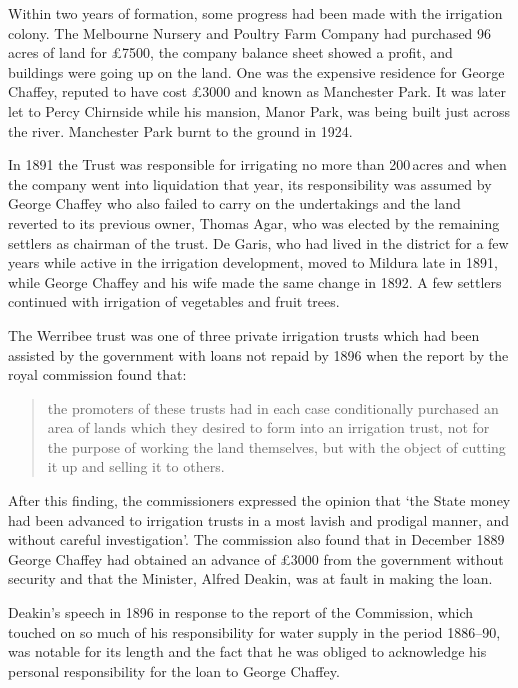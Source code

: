Within two years of formation, some progress had been made with the
irrigation colony.  The Melbourne Nursery and Poultry Farm Company had
purchased 96\,acres of land for \pounds7500, the company balance sheet
showed a profit, and buildings were going up on the land.  One was the
expensive residence for George Chaffey, reputed to have cost
\pounds3000 and known as Manchester Park.  It was later let to 
Percy Chirnside while his mansion, Manor Park, was being built just
across the river.  Manchester Park burnt to the ground in
1924.

In 1891 the Trust was responsible for irrigating no more than 200\,acres
and when the company went into liquidation that year, its
responsibility was assumed by George Chaffey who also failed to carry
on the undertakings and the land reverted to its previous owner,
Thomas Agar, who was elected by the remaining settlers as chairman of
the trust.  De Garis, who had lived in the district for a few years
while active in the irrigation development, moved to Mildura late in
1891, while George Chaffey and his wife made the same change in 1892.
A few settlers continued with irrigation of vegetables and fruit
trees.

The Werribee trust was one of three private irrigation trusts which
had been assisted by the government with loans not repaid by 1896 when
the report by the royal commission found that:
\begin{quote}
	the promoters of these trusts had in each case conditionally
	purchased an area of lands which they desired to form into an
	irrigation trust, not for the purpose of working the land
	themselves, but with the object of cutting it up and selling
	it to others.
\end{quote}
After this finding, the commissioners expressed the opinion that `the
State money had been advanced to irrigation trusts in a most lavish
and prodigal manner, and without careful investigation'. The
commission also found that in December 1889 George Chaffey had
obtained an advance of \pounds3000 from the government without
security and that the Minister, Alfred Deakin, was at fault in making
the loan.

Deakin's speech in 1896 in response to the report of the Commission,
which touched on so much of his responsibility for water supply in the
period 1886--90, was notable for its length and the fact that he was
obliged to acknowledge his personal responsibility for the loan to
George Chaffey.

